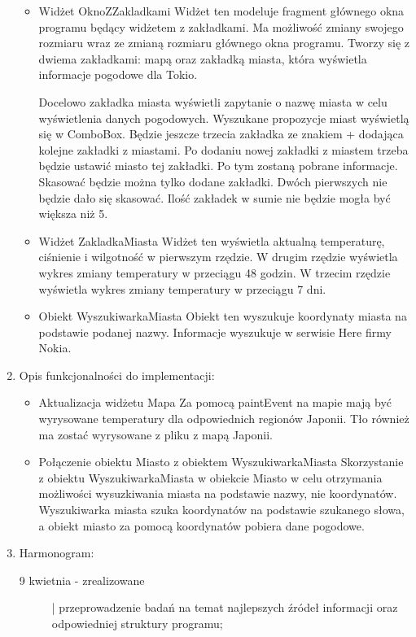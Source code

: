 \documentclass[a4paper]{article}
\begin{document}
\begin{enumerate}
\begin{itemize}
\item Widżet OknoZZakladkami
Widżet ten modeluje fragment głównego okna programu będący widżetem z zakładkami. Ma możliwość zmiany swojego rozmiaru wraz ze zmianą rozmiaru głównego okna programu. Tworzy się z dwiema zakładkami: mapą oraz zakładką miasta, która wyświetla informacje pogodowe dla Tokio.

Docelowo zakładka miasta wyświetli zapytanie o nazwę miasta w celu wyświetlenia danych pogodowych. Wyszukane propozycje miast wyświetlą się w ComboBox. Będzie jeszcze trzecia zakładka ze znakiem + dodająca kolejne zakładki z miastami. Po dodaniu nowej zakładki z miastem trzeba będzie ustawić miasto tej zakładki. Po tym zostaną pobrane informacje. Skasować będzie można tylko dodane zakładki. Dwóch pierwszych nie będzie dało się skasować. Ilość zakładek w sumie nie będzie mogła być większa niż 5.

\item Widżet ZakladkaMiasta
Widżet ten wyświetla aktualną temperaturę, ciśnienie i wilgotność w pierwszym rzędzie. W drugim rzędzie wyświetla wykres zmiany temperatury w przeciągu 48 godzin. W trzecim rzędzie wyświetla wykres zmiany temperatury w przeciągu 7 dni.

\item Obiekt WyszukiwarkaMiasta
Obiekt ten wyszukuje koordynaty miasta na podstawie podanej nazwy. Informacje wyszukuje w serwisie Here firmy Nokia.

\end{itemize}

\pagebreak
\item Opis funkcjonalności do implementacji:
\begin{itemize}
\item Aktualizacja widżetu Mapa
Za pomocą paintEvent na mapie mają być wyrysowane temperatury dla odpowiednich regionów Japonii. Tło również ma zostać wyrysowane z pliku z mapą Japonii.

\item Połączenie obiektu Miasto z obiektem WyszukiwarkaMiasta
Skorzystanie z obiektu WyszukiwarkaMiasta w obiekcie Miasto w celu otrzymania możliwości wysuzkiwania miasta na podstawie nazwy, nie koordynatów. Wyszukiwarka miasta szuka koordynatów na podstawie szukanego słowa, a obiekt miasto za pomocą koordynatów pobiera dane pogodowe.
\end{itemize}

\item Harmonogram:

\begin{description}
\item[9 kwietnia - zrealizowane] | przeprowadzenie badań na temat najlepszych źródeł informacji oraz odpowiedniej struktury programu;


\end{description}
\end{enumerate}
\end{document}

